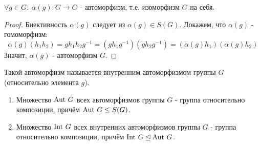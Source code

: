 \begin{enumerate}
    \begin{subtheorem}
        $\forall g \in G: \ \alpha(g): G \rightarrow G$ - автоморфизм, т.е. изоморфизм $G$ на себя.
    \end{subtheorem}
    \begin{proof} 
        Биективность $\alpha(g)$ следует из $\alpha(g) \in S(G)$. Докажем, что $\alpha(g)$ - гомоморфизм:
        \[\alpha(g)(h_1h_2) = gh_1h_2g^{-1} = (gh_1g^{-1})(gh_2g^{-1}) = (\alpha(g)h_1)(\alpha(g)h_2)\]
        Значит, $\alpha(g)$ - автоморфизм $G$.
    \end{proof}
    \begin{definition}
        Такой автоморфизм называется внутренним автоморфизмом группы $G$ (относительно элемента $g$).
    \end{definition}
\end{enumerate}
\begin{subtheorem}\tab
    \begin{enumerate}
        \item Множество $\textup{Aut }G$ всех автоморфизмов группы $G$ - группа относительно композиции, причём $\textup{Aut }G \leq S(G)$.
        \item Множество $\textup{Int }G$ всех внутренних автоморфизмов группы $G$ - группа относительно композиции, причём $\textup{Int }G \unlhd \textup{Aut }G$.
    \end{enumerate}
\end{subtheorem}
